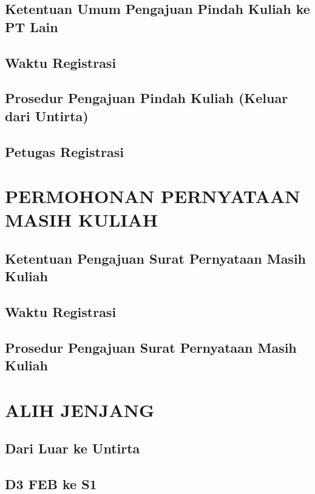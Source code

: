 \documentclass[
]{book}
\begin{document}
\hypertarget{ketentuan-umum-pengajuan-pindah-kuliah-ke-pt-lain}{%
\section{Ketentuan Umum Pengajuan Pindah Kuliah ke PT Lain}\label{ketentuan-umum-pengajuan-pindah-kuliah-ke-pt-lain}}

\hypertarget{waktu-registrasi}{%
\section{Waktu Registrasi}\label{waktu-registrasi}}

\hypertarget{prosedur-pengajuan-pindah-kuliah-keluar-dari-untirta}{%
\section{Prosedur Pengajuan Pindah Kuliah (Keluar dari Untirta)}\label{prosedur-pengajuan-pindah-kuliah-keluar-dari-untirta}}

\hypertarget{petugas-registrasi}{%
\section{Petugas Registrasi}\label{petugas-registrasi}}

\hypertarget{permohonan-pernyataan-masih-kuliah}{%
\chapter{PERMOHONAN PERNYATAAN MASIH KULIAH}\label{permohonan-pernyataan-masih-kuliah}}

\hypertarget{ketentuan-pengajuan-surat-pernyataan-masih-kuliah}{%
\section{Ketentuan Pengajuan Surat Pernyataan Masih Kuliah}\label{ketentuan-pengajuan-surat-pernyataan-masih-kuliah}}

\hypertarget{waktu-registrasi}{%
\section{Waktu Registrasi}\label{waktu-registrasi}}

\hypertarget{prosedur-pengajuan-surat-pernyataan-masih-kuliah}{%
\section{Prosedur Pengajuan Surat Pernyataan Masih Kuliah}\label{prosedur-pengajuan-surat-pernyataan-masih-kuliah}}

\hypertarget{alih-jenjang}{%
\chapter{ALIH JENJANG}\label{alih-jenjang}}

\hypertarget{dari-luar-ke-untirta}{%
\section{Dari Luar ke Untirta}\label{dari-luar-ke-untirta}}

\hypertarget{d3-feb-ke-s1}{%
\section{D3 FEB ke S1}\label{d3-feb-ke-s1}}

  
\end{document}
